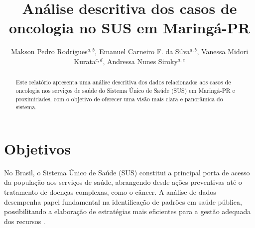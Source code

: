 \documentclass[a4paper]{modeloLEA} %
\begin{document}
\title{Análise descritiva dos casos de oncologia no SUS em Maringá-PR}

\author{
Makson Pedro Rodrigues$^{a,b}$,
Emanuel Carneiro F. da Silva$^{a,b}$,
Vanessa Midori Kurata$^{c,d}$,
Andressa Nunes Siroky$^{a,e}$}

\address{
  $^{a}$Departamento de Estatística - UFRN\\
  $^{b}$Consultor\\
  $^{c}$Prefeitura Municipal de Maringá\\
  $^{d}$Consulente\\
  $^{e}$Orientação}
\subject{
Estatística Aplicada à Saúde}



\begin{abstract}
Este relatório apresenta uma análise descritiva dos dados relacionados aos casos de oncologia nos serviços de saúde do Sistema Único de Saúde (SUS) em Maringá-PR e proximidades, com o objetivo de oferecer uma visão mais clara e panorâmica do sistema.
\end{abstract}

\providecommand{\tightlist}{%
  \setlength{\itemsep}{0pt}\setlength{\parskip}{0pt}}
\providecommand{\EndFirstPage}{%
}

\maketitle

\section{Objetivos}\label{objetivos}

No Brasil, o Sistema Único de Saúde (SUS) constitui a principal porta de acesso da população aos serviços de saúde, abrangendo desde ações preventivas até o tratamento de doenças complexas, como o câncer. A análise de dados desempenha papel fundamental na identificação de padrões em saúde pública, possibilitando a elaboração de estratégias mais eficientes para a gestão adequada dos recursos \cite{livroSUS}.
\end{document}
